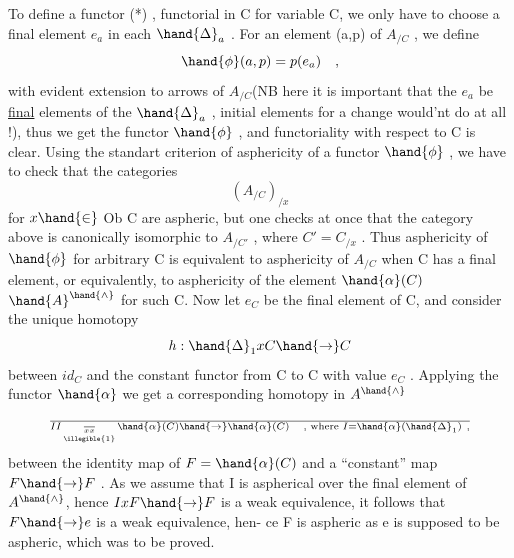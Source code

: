 
To define a functor (*) , functorial in C for variable C, we only
have to choose a final element $e_a$ in each $\hand{\Delta}_a$ . For an element (a,p) of
$A_{/C}$ , we define
\[ \hand{\phi}(a,p) = p(e_a) \quad , \]
with evident extension to arrows of $A_{/C}$\hand{\unsure{,}}(NB here it is important that the
$e_a$ be \uline{final} elements of the $\hand{\Delta}_a$ , initial elements for a change would'nt
do at all !), thus we get the functor $\hand{\phi}$ , and functoriality with respect to
C is clear. Using the standart criterion of asphericity of a functor $\hand{\phi}$ ,
we have to check that the categories
\[ (A_{/C})_{/x} \]
for $x \hand{\in}$ Ob C are aspheric, but one checks at once that the category above
is canonically isomorphic to $A_{/C'}$ , where $C' = C_{/x}$ . Thus asphericity
of $\hand{\phi}$ for arbitrary C is equivalent to asphericity of $A_{/C}$ when C has a
final element, or equivalently, to asphericity of the element $\hand{\alpha}(C)$  $\hand{A}^{\hand{\wedge}}$
for such C. Now let $e_C$ be the final element of C, and consider the 
unique homotopy
\[ h : \hand{\Delta}_1 x C \hand{\to} C \]
between $id_C$ and the constant functor from C to C with value $e_C$ . Applying
the functor $\hand{\alpha}$ we get a corresponding homotopy in $A^{\hand{\wedge}}$
\[ \over{I}{I}\,\underset{\illegible{1}}{\over{x}{x}}\,\hand{\alpha}(C) \hand{\to} \hand{\alpha}(C) \quad , \text{ where } I = \hand{\alpha}(\hand{\Delta}_1) \ , \]
between the identity map of $F = \hand{\alpha}(C)$ and a ``constant'' map $F \hand{\to} F$ . As we
assume that I is aspherical over the final element of $A^{\hand{\wedge}}$, hence $IxF \hand{\to} F$
is a weak equivalence, it follows that $F \hand{\to} e$ is a weak equivalence, hen-%
ce F is aspheric as e is supposed to be aspheric, which was to be proved.

